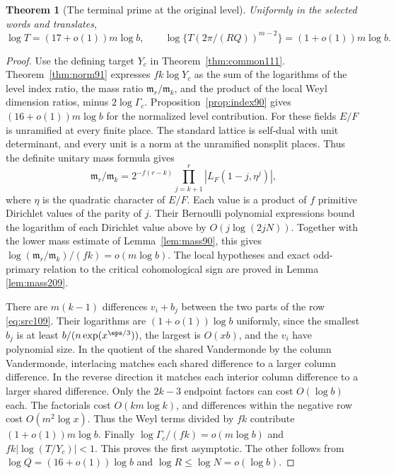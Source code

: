 \documentclass[a4paper,11pt]{article}
\newtheorem{theorem}[proposition]{Theorem}
\theoremstyle{definition}
\theoremstyle{remark}
\numberwithin{equation}{section}
\begin{document}
\begin{theorem}[The terminal prime at the original level]
\label{thm:prime210}
Uniformly in the selected words and translates,
\[
   \log T=(17+o(1))m\log b,\qquad
   \log\{T(2\pi/(RQ))^{m-2}\}=(1+o(1))m\log b .
\]
\end{theorem}
\begin{proof}
Use the defining target \(Y_c\) in Theorem~\ref{thm:common111}.
Theorem~\ref{thm:norm91} expresses \(fk\log Y_c\) as the sum
of the logarithms of the level index ratio, the mass ratio
\(\mathfrak m_r/\mathfrak m_k\), and the product of the local
Weyl dimension ratios, minus \(2\log\Gamma_c\).
Proposition~\ref{prop:index90} gives
\((16+o(1))m\log b\) for the normalized level contribution.
For these fields \(E/F\) is unramified at every finite place.
The standard lattice is self-dual with unit determinant, and
every unit is a norm at the unramified nonsplit places. Thus the
definite unitary mass formula gives
\[
 \mathfrak m_r/\mathfrak m_k
   =2^{-f(r-k)}\prod_{j=k+1}^{r}|L_F(1-j,\eta^j)|,
\]
where \(\eta\) is the quadratic character of \(E/F\).
Each value is a product of \(f\) primitive Dirichlet values
of the parity of \(j\). Their Bernoulli polynomial expressions
bound the logarithm of each Dirichlet value above by
\(O(j\log(2jN))\). Together with the lower mass estimate of
Lemma~\ref{lem:mass90}, this gives
\(\log(\mathfrak m_r/\mathfrak m_k)/(fk)=o(m\log b)\).
The local hypotheses and exact odd-primary relation to the
critical cohomological sign are proved in
Lemma \ref{lem:mass209}.

There are \(m(k-1)\) differences \(v_i+b_j\) between the two
parts of the row \eqref{eq:src109}. Their logarithms are
\((1+o(1))\log b\) uniformly, since the smallest \(b_j\)
is at least \(b/(n\exp(x^{\eps/3}))\), the largest is
\(O(xb)\), and the \(v_i\) have polynomial size. In the quotient
of the shared Vandermonde by the column Vandermonde, interlacing
matches each shared difference to a larger column difference.
In the reverse direction it matches each interior column
difference to a larger shared difference. Only the \(2k-3\)
endpoint factors can cost \(O(\log b)\) each. The factorials
cost \(O(km\log k)\), and differences within the negative row
cost \(O(m^2\log x)\). Thus the Weyl terms divided by \(fk\)
contribute \((1+o(1))m\log b\). Finally
\(\log\Gamma_c/(fk)=o(m\log b)\) and \(fk|\log(T/Y_c)|<1\).
This proves the first asymptotic. The other follows from
\(\log Q=(16+o(1))\log b\) and \(\log R\le\log N=o(\log b)\).
\end{proof}
\end{document}
